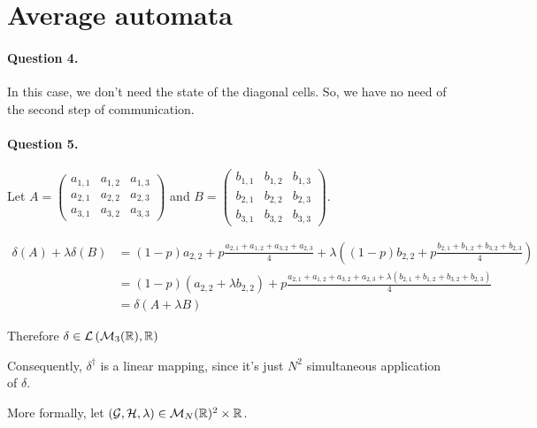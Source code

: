 \section{Average automata}

\paragraph{Question 4.}

In this case, we don't need the state of the diagonal cells. So, we have no need of the second step of communication.

\paragraph{Question 5.}

Let $A=
        \left(
            \begin{matrix}
                a_{1,1} & a_{1,2} & a_{1,3} \\ 
                a_{2,1} & a_{2,2} & a_{2,3} \\ 
                a_{3,1} & a_{3,2} & a_{3,3}
            \end{matrix}
        \right)$
         and 
    $B = 
        \left(
            \begin{matrix}
                b_{1,1} & b_{1,2} & b_{1,3} \\ 
                b_{2,1} & b_{2,2} & b_{2,3} \\ 
                b_{3,1} & b_{3,2} & b_{3,3}
            \end{matrix}
        \right)$.

$$
    \begin{aligned}
        \delta(A) + \lambda\delta(B) &= (1-p) a_{2,2} + p\frac{a_{2,1}+a_{1,2}+a_{3,2}+a_{2,3}}{4} + \lambda\left( (1-p) b_{2,2} + p\frac{b_{2,1}+b_{1,2}+b_{3,2}+b_{2,3}}{4} \right)\\
        &= (1-p) (a_{2,2} + \lambda b_{2,2}) + p\frac{a_{2,1}+a_{1,2}+a_{3,2}+a_{2,3} + \lambda (b_{2,1}+b_{1,2}+b_{3,2}+b_{2,3})}{4}\\
        &=\delta(A + \lambda B)
    \end{aligned}
$$

Therefore $\delta \in \mathcal{L}\left( \mathcal{M}_3(\mathbb{R}), \mathbb{R}\right)$

Consequently, $\delta^\dagger$ is a linear mapping, since it's just $N^2$ simultaneous application of $\delta$.

More formally, let $(\mathcal{G},\mathcal{H},\lambda) \in \mathcal{M}_N(\mathbb{R})^2\times \mathbb{R}$.

